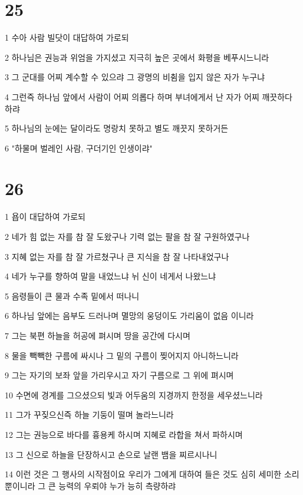 \chapter{25}

\par 1 수아 사람 빌닷이 대답하여 가로되
\par 2 하나님은 권능과 위엄을 가지셨고 지극히 높은 곳에서 화평을 베푸시느니라
\par 3 그 군대를 어찌 계수할 수 있으랴 그 광명의 비췸을 입지 않은 자가 누구냐
\par 4 그런즉 하나님 앞에서 사람이 어찌 의롭다 하며 부녀에게서 난 자가 어찌 깨끗하다 하랴
\par 5 하나님의 눈에는 달이라도 명랑치 못하고 별도 깨끗지 못하거든
\par 6 "하물며 벌레인 사람, 구더기인 인생이랴"

\chapter{26}

\par 1 욥이 대답하여 가로되
\par 2 네가 힘 없는 자를 참 잘 도왔구나 기력 없는 팔을 참 잘 구원하였구나
\par 3 지혜 없는 자를 참 잘 가르쳤구나 큰 지식을 참 잘 나타내었구나
\par 4 네가 누구를 향하여 말을 내었느냐 뉘 신이 네게서 나왔느냐
\par 5 음령들이 큰 물과 수족 밑에서 떠나니
\par 6 하나님 앞에는 음부도 드러나며 멸망의 웅덩이도 가리움이 없음 이니라
\par 7 그는 북편 하늘을 허공에 펴시며 땅을 공간에 다시며
\par 8 물을 빽빽한 구름에 싸시나 그 밑의 구름이 찢어지지 아니하느니라
\par 9 그는 자기의 보좌 앞을 가리우시고 자기 구름으로 그 위에 펴시며
\par 10 수면에 경계를 그으셨으되 빛과 어두움의 지경까지 한정을 세우셨느니라
\par 11 그가 꾸짖으신즉 하늘 기둥이 떨며 놀라느니라
\par 12 그는 권능으로 바다를 흉용케 하시며 지혜로 라합을 쳐서 파하시며
\par 13 그 신으로 하늘을 단장하시고 손으로 날랜 뱀을 찌르시나니
\par 14 이런 것은 그 행사의 시작점이요 우리가 그에게 대하여 들은 것도 심히 세미한 소리뿐이니라 그 큰 능력의 우뢰야 누가 능히 측량하랴

